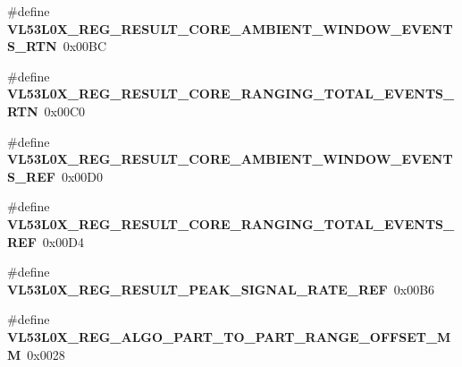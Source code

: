 \begin{DoxyCompactItemize}
\mbox{\label{group__VL53L0X__DefineRegisters__group_ga13691b09276bccaf8d666717ed8be5c3}} 
\#define {\bfseries V\+L53\+L0\+X\+\_\+\+R\+E\+G\+\_\+\+R\+E\+S\+U\+L\+T\+\_\+\+C\+O\+R\+E\+\_\+\+A\+M\+B\+I\+E\+N\+T\+\_\+\+W\+I\+N\+D\+O\+W\+\_\+\+E\+V\+E\+N\+T\+S\+\_\+\+R\+TN}~0x00\+BC
\item 
\mbox{\label{group__VL53L0X__DefineRegisters__group_ga12d588fa642691da2149e7e6b2d40a40}} 
\#define {\bfseries V\+L53\+L0\+X\+\_\+\+R\+E\+G\+\_\+\+R\+E\+S\+U\+L\+T\+\_\+\+C\+O\+R\+E\+\_\+\+R\+A\+N\+G\+I\+N\+G\+\_\+\+T\+O\+T\+A\+L\+\_\+\+E\+V\+E\+N\+T\+S\+\_\+\+R\+TN}~0x00\+C0
\item 
\mbox{\label{group__VL53L0X__DefineRegisters__group_gad800373257e5566cc7bbc518fb2f9c9d}} 
\#define {\bfseries V\+L53\+L0\+X\+\_\+\+R\+E\+G\+\_\+\+R\+E\+S\+U\+L\+T\+\_\+\+C\+O\+R\+E\+\_\+\+A\+M\+B\+I\+E\+N\+T\+\_\+\+W\+I\+N\+D\+O\+W\+\_\+\+E\+V\+E\+N\+T\+S\+\_\+\+R\+EF}~0x00\+D0
\item 
\mbox{\label{group__VL53L0X__DefineRegisters__group_ga0ef0fd15d39693e57e0359c3772f0ce4}} 
\#define {\bfseries V\+L53\+L0\+X\+\_\+\+R\+E\+G\+\_\+\+R\+E\+S\+U\+L\+T\+\_\+\+C\+O\+R\+E\+\_\+\+R\+A\+N\+G\+I\+N\+G\+\_\+\+T\+O\+T\+A\+L\+\_\+\+E\+V\+E\+N\+T\+S\+\_\+\+R\+EF}~0x00\+D4
\item 
\mbox{\label{group__VL53L0X__DefineRegisters__group_ga5e6507db3533c665dacc5f54c595e3fb}} 
\#define {\bfseries V\+L53\+L0\+X\+\_\+\+R\+E\+G\+\_\+\+R\+E\+S\+U\+L\+T\+\_\+\+P\+E\+A\+K\+\_\+\+S\+I\+G\+N\+A\+L\+\_\+\+R\+A\+T\+E\+\_\+\+R\+EF}~0x00\+B6
\item 
\mbox{\label{group__VL53L0X__DefineRegisters__group_ga4a57a8f4f251b26583074905e614bcaf}} 
\#define {\bfseries V\+L53\+L0\+X\+\_\+\+R\+E\+G\+\_\+\+A\+L\+G\+O\+\_\+\+P\+A\+R\+T\+\_\+\+T\+O\+\_\+\+P\+A\+R\+T\+\_\+\+R\+A\+N\+G\+E\+\_\+\+O\+F\+F\+S\+E\+T\+\_\+\+MM}~0x0028
\item 
\mbox{\label{group__VL53L0X__DefineRegisters__group_ga1782cce453f7858909d744eb5ef7d003}} 

\end{DoxyCompactItemize}
